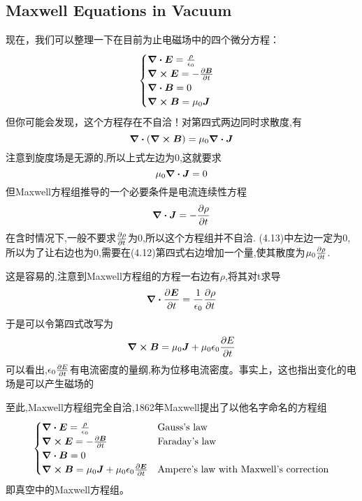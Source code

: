 \documentclass[14pt,oneside]{book}
\def \J{\vb*{J}}
\begin{document}
\begin{large}
\subsection{Maxwell Equations in Vacuum}
现在，我们可以整理一下在目前为止电磁场中的四个微分方程：
\begin{align}
        \begin{cases}
                \div{\vb*{E}}=\frac{\rho}{\epsilon_0}\\
                \curl{\vb*{E}}=-\pdv{\vb*{B}}{t}\\
                \div{\vb*{B}}=0\\
                \curl{\vb*{B}}=\mu_0\vb*{J}
        \end{cases}
\end{align}
但你可能会发现，这个方程存在不自洽！对第四式两边同时求散度,有
\begin{equation}
  \div{(\curl{\vb*{B}})}=\mu_0 \div{\J}
\end{equation}
注意到旋度场是无源的,所以上式左边为0,这就要求
\begin{equation}
  \mu_0 \div{\J}=0
\end{equation}
但Maxwell方程组推导的一个必要条件是电流连续性方程
\begin{equation}
  \div{\J}=-\pdv{\rho}{t}
\end{equation}
在含时情况下,一般不要求$\pdv{\rho}{t}$为0,所以这个方程组并不自洽.
(4.13)中左边一定为0,所以为了让右边也为0,需要在(4.12)第四式右边增加一个量,使其散度为$\mu_0\pdv{\rho}{t}$.

这是容易的,注意到Maxwell方程组的方程一右边有$\rho$,将其对t求导
\begin{equation}
  \div{\pdv{\vb*{E}}{t}}=\frac{1}{\epsilon_0}\pdv{\rho}{t}
\end{equation}
于是可以令第四式改写为
\begin{equation}
  \curl{\vb*{B}}=\mu_0\vb*{J}+\mu_0\epsilon_0\pdv{E}{t}
\end{equation}
可以看出,$\epsilon_0\pdv{E}{t}$有电流密度的量纲,称为位移电流密度。事实上，这也指出变化的电场是可以产生磁场的

至此,Maxwell方程组完全自洽,1862年Maxwell提出了以他名字命名的方程组
\begin{align}
        \begin{cases}
                \div{\vb*{E}}=\frac{\rho}{\epsilon_0} & \text{Gauss's law}\\
                \curl{\vb*{E}}=-\pdv{\vb*{B}}{t} & \text{Faraday's law}\\
                \div{\vb*{B}}=0\\
                \curl{\vb*{B}}=\mu_0\vb*{J}+\mu_0\epsilon_0\pdv{\vb*{E}}{t}& \text{Ampere's law with Maxwell's correction}
        \end{cases}
\end{align}
即真空中的Maxwell方程组。


\end{large}
\end{document}
